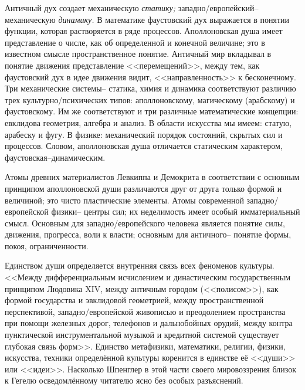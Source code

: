 Античный дух создает механическую \emph{статику;} западно\-/европейский\---механическую \emph{динамику.} В математике фаустовский дух выражается в понятии функции, которая растворяется в ряде процессов. Аполлоновская душа имеет представление о числе, как об определенной и конечной величине; это в известном смысле пространственное понятие. Античный мир вкладывал в понятие движения представление 	<<перемещений>>, между тем, как фаустовский дух в идее движения видит, <<направленность>> к бесконечному. Три механические системы\--- статика, химия и динамика соответствуют различию трех культурно\-/психических типов: аполлоновскому, магическому (арабскому) и фаустовскому. Им же соответствуют и три различные математические концепции: евклидова геометрия, алгебра и анализ. В области искусства мы имеем: статую, арабеску и фугу. В физике: механический порядок состояний, скрытых сил и процессов. Словом, аполлоновская душа отличается статическим характером, фаустовская\---динамическим.

Атомы древних материалистов Левкиппа и Демокрита в соответствии с основным принципом аполлоновской души различаются друг от друга только формой и величиной; это чисто пластические элементы. Атомы современной западно\-/европейской физики\--- центры сил; их неделимость имеет особый имматериальный смысл. Основным для западно\-/европейского человека является понятие силы, движения, прогресса, воли к власти; основным для античного\--- понятие формы, покоя, ограниченности.

Единством души определяется внутренняя связь всех феноменов культуры. <<Между дифференциальным исчислением и династическим государственным принципом Людовика XIV, между античным городом (<<полисом>>), как формой государства и эвклидовой геометрией, между пространственной перспективой, западно\-/европейской живописью и преодолением пространства при помощи железных дорог, телефонов и дальнобойных орудий, между контра пунктической инструментальной музыкой и кредитной системой существует глубокая связь форм>>. Единство метафизики, математики, религии, физики, искусства, техники определённой культуры коренится в единстве её <<души>> или <<идеи>>. Насколько Шпенглер в этой части своего мировоззрения близок к Гегелю осведомлённому читателю ясно без особых разъяснений.

